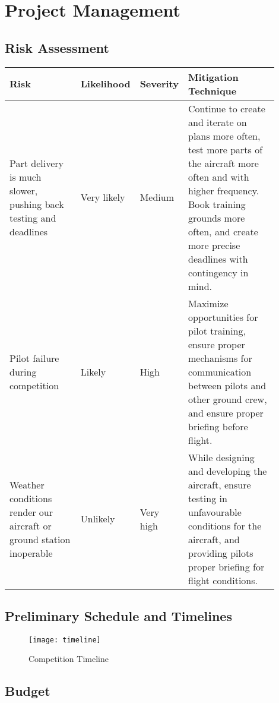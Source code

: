 \clearpage
\section{Project Management}
\label{sec:technical}

\subsection{Risk Assessment}

\begin{table}[htpb]
	\centering
	\begin{tabular}{p{0.28\linewidth}  p{0.14\linewidth}  p{0.12\linewidth}
		 p{0.36\linewidth} }

		\textbf{Risk} &
		\textbf{Likelihood} & \textbf{Severity} &
		\textbf{Mitigation Technique} \\ \midrule

	    Part delivery is much
		slower, pushing back
		testing and deadlines &
		Very likely & Medium & %
		Continue to create and iterate on plans more often, test more parts of
		the aircraft more often and with higher frequency. Book training
		grounds more often, and create more precise deadlines with contingency
		in mind. \\ \midrule

	    Pilot failure during competition &
		Likely & High & %
		Maximize opportunities for pilot training, ensure proper mechanisms for
		communication between pilots and other ground crew, and ensure proper
		briefing before flight. \\ \midrule

	    Weather conditions render our aircraft or ground station inoperable &
		Unlikely & Very high & %
		While designing and developing the aircraft, ensure testing in
		unfavourable conditions for the aircraft, and providing pilots proper
		briefing for flight conditions. \\ \midrule

	\end{tabular}
\end{table}

\subsection{Preliminary Schedule and Timelines}

\begin{figure}[h]
	\caption{Competition Timeline}
	\centering
	\texttt{[image: timeline]}
\end{figure}


\subsection{Budget}

